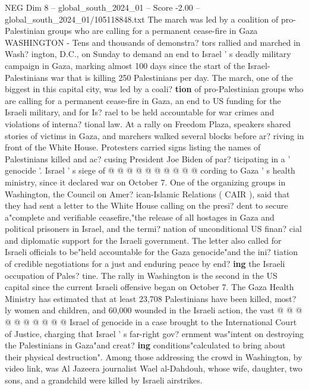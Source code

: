 \begin{textsample}{NEG Dim 8 – global\_south\_2024\_01 – Score -2.00 – global\_south\_2024\_01/105118848.txt}  \label{ex:f8_neg_050}
The march was led by a coalition of pro-Palestinian groups who are calling for a permanent cease-fire in Gaza WASHINGTON - Tens and thousands of demonstra? tors rallied and marched in Wash? ington, D.C., on Sunday to demand an end to Israel ' s deadly military campaign in Gaza, marking almost 100 days since the start of the Israel-Palestinians war that is killing 250 Palestinians per day.
The march, one of the biggest in this capital city, was led by a coali? \textbf{tion} of pro-Palestinian groups who are calling for a permanent cease-fire in Gaza, an end to US funding for the Israeli military, and for Is? rael to be held accountable for war crimes and violations of interna? tional law.
At a rally on Freedom Plaza, speakers shared stories of victims in Gaza, and marchers walked several blocks before ar? riving in front of the White House.
Protesters carried signs listing the names of Palestinians killed and ac? cusing President Joe Biden of par? ticipating in a ' genocide '.
Israel ' s siege of @ @ @ @ @ @ @ @ @ @ cording to Gaza ' s health ministry, since it declared war on October 7.
One of the organizing groups in Washington, the Council on Amer? ican-Islamic Relations ( CAIR ), said that they had sent a letter to the White House calling on the presi? dent to secure a"complete and verifiable ceasefire,"the release of all hostages in Gaza and political prisoners in Israel, and the termi? nation of unconditional US finan? cial and diplomatic support for the Israeli government.
The letter also called for Israeli officials to be"held accountable for the Gaza genocide"and the ini? tiation of credible negotiations for a just and enduring peace by end? \textbf{ing} the Israeli occupation of Pales? tine.
The rally in Washington is the second in the US capital since the current Israeli offensive began on October 7.
The Gaza Health Ministry has estimated that at least 23,708 Palestinians have been killed, most? ly women and children, and 60,000 wounded in the Israeli action, the vast @ @ @ @ @ @ @ @ @ @ Israel of genocide in a case brought to the International Court of Justice, charging that Israel ' s far-right gov? ernment was"intent on destroying the Palestinians in Gaza"and creat? \textbf{ing} conditions"calculated to bring about their physical destruction".
Among those addressing the crowd in Washington, by video link, was Al Jazeera journalist Wael al-Dahdouh, whose wife, daughter, two sons, and a grandchild were killed by Israeli airstrikes.

\end{textsample}
